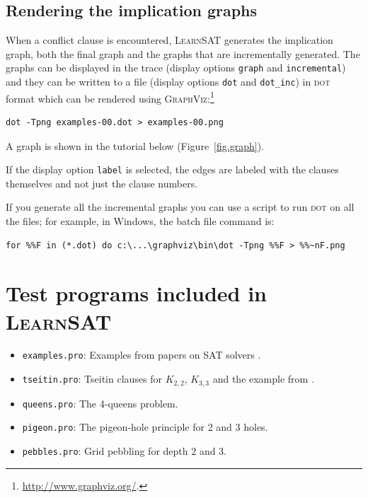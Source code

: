 \documentclass[11pt]{report}
\newcommand*{\p}[1]{\textup{\texttt{#1}}}
\newcommand*{\ls}{\textsc{LearnSAT}}
\newcommand*{\dt}{\textsc{dot}}
\begin{document}
\subsection{Rendering the implication graphs}\label{s.impl}

When a conflict clause is encountered, \ls{} generates the implication
graph, both the final graph and the graphs that are incrementally
generated. The graphs can be displayed in the trace (display options
\p{graph} and \p{incremental}) and they can be written to a file
(display options \p{dot} and \p{dot\_inc}) in \dt{} format which can be
rendered using
\textsc{GraphViz}:\footnote{\url{http://www.graphviz.org/}.}

\begin{verbatim}
dot -Tpng examples-00.dot > examples-00.png
\end{verbatim}

A graph is shown in the tutorial below (Figure~\ref{fig.graph}).

If the display option \p{label} is selected, the edges are labeled with
the clauses themselves and not just the clause numbers.

If you generate all the incremental graphs you can use a script to run
\dt{} on all the files; for example, in Windows, the batch file command
is:
\begin{verbatim}
for %%F in (*.dot) do c:\...\graphviz\bin\dot -Tpng %%F > %%~nF.png
\end{verbatim}

\section{Test programs included in \ls{}}

\begin{itemize}
\item \p{examples.pro}: Examples from papers on SAT
solvers \cite{mz,mlm,ms}.

\item \p{tseitin.pro}: Tseitin clauses for $K_{2,2}$,
$K_{3,3}$ and the example from \cite[Section 4.5]{mlcs}.

\item \p{queens.pro}: The 4-queens problem.

\item \p{pigeon.pro}: The pigeon-hole principle for 2 and 3 holes.

\item \p{pebbles.pro}: Grid pebbling for depth 2 and 3.
\end{itemize}
\end{document}
